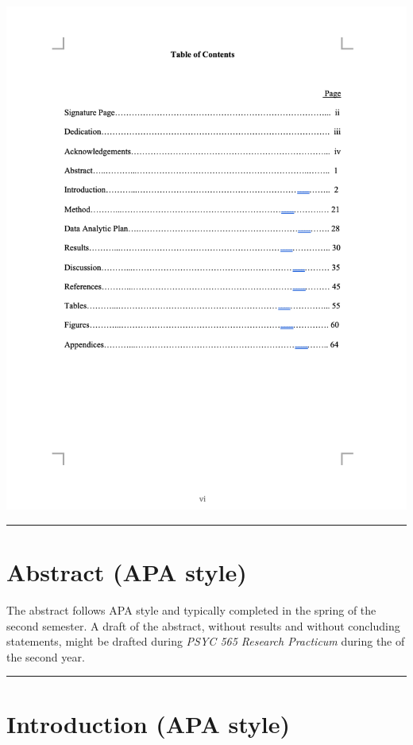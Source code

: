 \documentclass[openany]{book}
\begin{document}
\includegraphics{images/tablecontents.png}

\begin{center}\rule{0.5\linewidth}{0.5pt}\end{center}

\hypertarget{abstract-apa-style}{%
\section{Abstract (APA style)}\label{abstract-apa-style}}

The abstract follows APA style and typically completed in the spring of the second semester. A draft of the abstract, without results and without concluding statements, might be drafted during \emph{PSYC 565 Research Practicum} during the of the second year.

\begin{center}\rule{0.5\linewidth}{0.5pt}\end{center}

\hypertarget{introduction-apa-style}{%
\section{Introduction (APA style)}\label{introduction-apa-style}}
\end{document}
